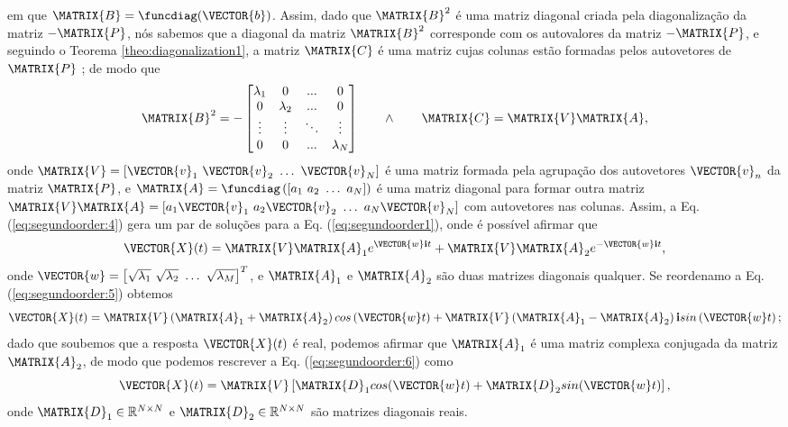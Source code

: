 \begin{myproofT}
em que $\MATRIX{B}=\funcdiag(\VECTOR{b})$. 
Assim, dado que $\MATRIX{B}^2$ é uma matriz diagonal criada pela diagonalização da  
matriz $-\MATRIX{P}$, nós sabemos que
a diagonal da matriz $\MATRIX{B}^2$ corresponde com os autovalores da matriz $-\MATRIX{P}$,
e seguindo o Teorema \ref{theo:diagonalization1}, a matriz $\MATRIX{C}$ é uma matriz cujas colunas estão formadas pelos 
autovetores de $\MATRIX{P}$ \cite[pp. 67]{golub2013matrix}; de modo que
\begin{equation}\label{eq:segundoorder:4}
\MATRIX{B}^2=-
\begin{bmatrix}
\lambda_1 & 0         & ...    & 0 \\
0         & \lambda_2 & ...    & 0 \\
\vdots    & \vdots    & \ddots & \vdots \\
0         & 0         & ...    & \lambda_N
\end{bmatrix}
\qquad \wedge \qquad \MATRIX{C}=\MATRIX{V}\MATRIX{A}, 
\end{equation}
onde $\MATRIX{V}=\left[ \VECTOR{v}_1~  \VECTOR{v}_2~  \dots~ \VECTOR{v}_N\right]$ 
é uma matriz formada pela agrupação dos autovetores $\VECTOR{v}_n$ da matriz $\MATRIX{P}$,
e $\MATRIX{A}=\funcdiag\left(\left[ a_1~  a_2~  \dots~ a_N\right]\right)$ 
é uma matriz diagonal para formar outra matriz  
$\MATRIX{V}\MATRIX{A}=\left[ a_1\VECTOR{v}_1~  a_2\VECTOR{v}_2~  \dots~ a_N\VECTOR{v}_N\right]$
com autovetores nas colunas.
Assim, a Eq. (\ref{eq:segundoorder:4}) gera um par de soluções para a Eq. (\ref{eq:segundoorder1}),
onde é possível afirmar que
\begin{equation}\label{eq:segundoorder:5}
\VECTOR{X}(t)=\MATRIX{V}\MATRIX{A}_1 e^{\VECTOR{w} \mathbf{i} t}+ \MATRIX{V}\MATRIX{A}_2 e^{-\VECTOR{w} \mathbf{i} t},
\end{equation}
onde $\VECTOR{w}=\left[ \sqrt{\lambda_1}~ \sqrt{\lambda_2}~ \dots~ \sqrt{\lambda_M}\right]^{T}$, 
e $\MATRIX{A}_1$ e $\MATRIX{A}_2$ são duas matrizes diagonais qualquer.
Se reordenamo a Eq. (\ref{eq:segundoorder:5}) obtemos
\begin{equation}\label{eq:segundoorder:6}
\VECTOR{X}(t)=
\MATRIX{V}\left(\MATRIX{A}_1+\MATRIX{A}_2\right) cos\left(\VECTOR{w}  t\right)+ 
\MATRIX{V}\left(\MATRIX{A}_1-\MATRIX{A}_2\right) \mathbf{i} sin\left(\VECTOR{w}  t\right);
\end{equation}
dado que soubemos que a resposta $\VECTOR{X}(t)$ é real, 
podemos afirmar que $\MATRIX{A}_1$ é uma matriz complexa conjugada da matriz $\MATRIX{A}_2$,
de modo que podemos rescrever a Eq. (\ref{eq:segundoorder:6}) como
\begin{equation}\label{eq:segundoorder:7}
 \VECTOR{X}(t)= \MATRIX{V}\left[\MATRIX{D}_1 cos(\VECTOR{w}t) + \MATRIX{D}_2 sin(\VECTOR{w}t) \right],
\end{equation}
onde $\MATRIX{D}_1 \in \mathbb{R}^{N\times N}$ e $\MATRIX{D}_2 \in \mathbb{R}^{N\times N}$ 
são matrizes diagonais reais. 
\end{myproofT}
